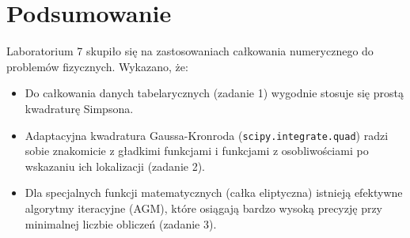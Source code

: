\documentclass[12pt, a4paper]{article}
\begin{document}
\section{Podsumowanie}

Laboratorium 7 skupiło się na zastosowaniach całkowania numerycznego do problemów fizycznych. Wykazano, że:
\begin{itemize}
  \item Do całkowania danych tabelarycznych (zadanie 1) wygodnie stosuje się prostą kwadraturę Simpsona.
  \item Adaptacyjna kwadratura Gaussa-Kronroda (\texttt{scipy.integrate.quad}) radzi sobie znakomicie z gładkimi funkcjami i funkcjami z osobliwościami po wskazaniu ich lokalizacji (zadanie 2).
  \item Dla specjalnych funkcji matematycznych (całka eliptyczna) istnieją efektywne algorytmy iteracyjne (AGM), które osiągają bardzo wysoką precyzję przy minimalnej liczbie obliczeń (zadanie 3).
\end{itemize}
\end{document}
